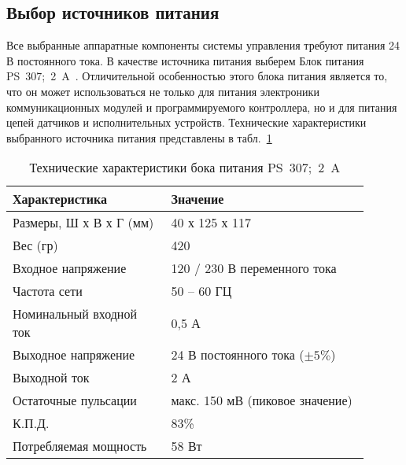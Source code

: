 \subsection{Выбор источников питания} \label{subsect5_2_3}

Все выбранные аппаратные компоненты системы управления требуют питания 24 В постоянного тока. В качестве источника питания выберем Блок питания PS~307;~2~A~\cite{siemens3}. Отличительной особенностью этого блока питания является то, что он может использоваться не только для питания электроники коммуникационных модулей и программируемого контроллера, но и для питания цепей датчиков и исполнительных устройств. Технические характеристики выбранного источника питания представлены в табл.~\ref{5.tabl:PS307}

\begin{table}[h!]
\caption{Технические характеристики бока питания PS~307;~2~A}
\label{5.tabl:PS307}
 
\begin{center}
\begin{tabular}{|p{0.4\linewidth}|p{0.5\linewidth}|}
\hline
Характеристика          & Значение                            \\
\hline
Размеры, Ш х В х Г (мм) & 40 х 125 х 117                      \\
\hline
Вес (гр)                & 420                                 \\
\hline
Входное напряжение      & 120 / 230 В переменного тока        \\
\hline
Частота сети            & 50 -- 60 ГЦ                         \\
\hline
Номинальный входной ток & 0,5 А                               \\
\hline
Выходное напряжение     & 24 В постоянного тока ($ \pm 5 \%$) \\
\hline
Выходной ток            & 2 А                                 \\
\hline
Остаточные пульсации    & макс. 150 мВ (пиковое значение)     \\
\hline
К.П.Д.                  & 83\%                                \\
\hline
Потребляемая мощность   & 58 Вт                               \\
\hline
 
\end{tabular}
\end{center}
\end{table}      

